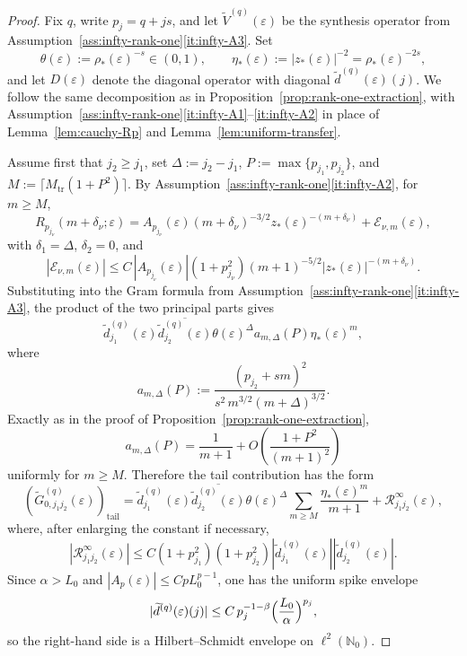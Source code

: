 \documentclass[11pt]{amsart}
\numberwithin{equation}{section}
\theoremstyle{plain}
\theoremstyle{definition}
\theoremstyle{remark}
\begin{document}
\begin{proof}
Fix \(q\), write \(p_j=q+js\), and let
\(\widetilde V^{(q)}(\varepsilon)\) be the synthesis operator from
Assumption~\ref{ass:infty-rank-one}\textup{\ref{it:infty-A3}}. Set
\[
\theta(\varepsilon):=\rho_*(\varepsilon)^{-s}\in(0,1),
\qquad
\eta_*(\varepsilon):=|z_*(\varepsilon)|^{-2}=\rho_*(\varepsilon)^{-2s},
\]
and let \(D(\varepsilon)\) denote the diagonal operator with diagonal
\(\widetilde d^{(q)}(\varepsilon)(j)\). We follow the same decomposition as in
Proposition~\ref{prop:rank-one-extraction}, with
Assumption~\ref{ass:infty-rank-one}\textup{\ref{it:infty-A1}--\ref{it:infty-A2}}
in place of Lemma~\ref{lem:cauchy-Rp} and Lemma~\ref{lem:uniform-transfer}.

Assume first that \(j_2\ge j_1\), set \(\Delta:=j_2-j_1\),
\(P:=\max\{p_{j_1},p_{j_2}\}\), and
\(M:=\lceil M_{\mathrm{tr}}(1+P^2)\rceil\). By
Assumption~\ref{ass:infty-rank-one}\textup{\ref{it:infty-A2}}, for
\(m\ge M\),
\[
R_{p_{j_\nu}}(m+\delta_\nu;\varepsilon)
=
A_{p_{j_\nu}}(\varepsilon)(m+\delta_\nu)^{-3/2}
z_*(\varepsilon)^{-(m+\delta_\nu)}
+
\mathcal E_{\nu,m}(\varepsilon),
\]
with \(\delta_1=\Delta\), \(\delta_2=0\), and
\[
|\mathcal E_{\nu,m}(\varepsilon)|
\le
C\,|A_{p_{j_\nu}}(\varepsilon)|(1+p_{j_\nu}^2)(m+1)^{-5/2}
|z_*(\varepsilon)|^{-(m+\delta_\nu)}.
\]
Substituting into the Gram formula from
Assumption~\ref{ass:infty-rank-one}\textup{\ref{it:infty-A3}}, the product of
the two principal parts gives
\[
\widetilde d^{(q)}_{j_1}(\varepsilon)
\overline{\widetilde d^{(q)}_{j_2}(\varepsilon)}
\theta(\varepsilon)^\Delta
a_{m,\Delta}(P)\eta_*(\varepsilon)^m,
\]
where
\[
a_{m,\Delta}(P):=
\frac{(p_{j_2}+sm)^2}{s^2\,m^{3/2}(m+\Delta)^{3/2}}.
\]
Exactly as in the proof of Proposition~\ref{prop:rank-one-extraction},
\[
a_{m,\Delta}(P)=\frac{1}{m+1}+O\!\left(\frac{1+P^2}{(m+1)^2}\right)
\]
uniformly for \(m\ge M\). Therefore the tail contribution has the form
\begin{equation}\label{eq:infty-tail-structure}
(\widetilde G^{(q)}_{0,j_1j_2}(\varepsilon))_{\mathrm{tail}}
=
\widetilde d^{(q)}_{j_1}(\varepsilon)
\overline{\widetilde d^{(q)}_{j_2}(\varepsilon)}
\theta(\varepsilon)^\Delta
\sum_{m\ge M}\frac{\eta_*(\varepsilon)^m}{m+1} +
\mathcal R^{\infty}_{j_1j_2}(\varepsilon),
\end{equation}
where, after enlarging the constant if necessary,
\[
|\mathcal R^{\infty}_{j_1j_2}(\varepsilon)|
\le
C(1+p_{j_1}^2)(1+p_{j_2}^2)
|\widetilde d^{(q)}_{j_1}(\varepsilon)|
|\widetilde d^{(q)}_{j_2}(\varepsilon)|.
\]
Since \(\alpha>L_0\) and
\(|A_p(\varepsilon)|\le C pL_0^{p-1}\), one has the uniform spike envelope
\[
|\widetilde d^{(q)}(\varepsilon)(j)|
\le
C\,p_j^{-1-\beta}\Bigl(\frac{L_0}{\alpha}\Bigr)^{p_j},
\]
so the right-hand side is a Hilbert--Schmidt envelope on
\(\ell^2(\mathbb N_0)\).


\end{proof}
\end{document}
